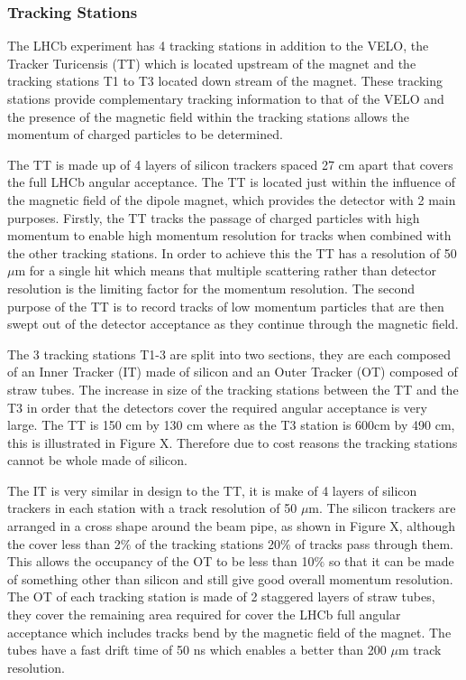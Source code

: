 \subsubsection{Tracking Stations} 
The LHCb experiment has 4 tracking stations in addition to the VELO, the Tracker Turicensis (TT) which is located upstream of the magnet and the tracking stations T1 to T3 located down stream of the magnet. These tracking stations provide complementary tracking information to that of the VELO and the presence of the magnetic field within the tracking stations allows the momentum of charged particles to be determined. 



The TT is made up of 4 layers of silicon trackers spaced 27 cm apart that covers the full LHCb angular acceptance. The TT is located just within the influence of the magnetic field of the dipole magnet, which provides the detector with 2 main purposes. Firstly, the TT tracks the passage of charged particles with high momentum to enable high momentum resolution for tracks when combined with the other tracking stations. In order to achieve this the TT has a resolution of 50 $\mu$m for a single hit which means that multiple scattering rather than detector resolution is the limiting factor for the momentum resolution. The second purpose of the TT is to record tracks of low momentum particles that are then swept out of the detector acceptance as they continue through the magnetic field. 


The 3 tracking stations T1-3 are split into two sections, they are each composed of an Inner Tracker (IT) made of silicon and an Outer Tracker (OT) composed of straw tubes. 
The increase in size of the tracking stations between the TT and the T3 in order that the detectors cover the required angular acceptance is very large.  The TT is 150 cm by 130 cm where as the T3 station is 600cm by 490 cm, this is illustrated in Figure X. Therefore due to cost reasons the tracking stations cannot be whole made of silicon. 

The IT is very similar in design to the TT, it is make of 4 layers of silicon trackers in each station with a track resolution of 50 $\mu$m.
The silicon trackers are arranged in a cross shape around the beam pipe, as shown in Figure X, although the cover less than 2$\%$ of the tracking stations 20$\%$ of tracks pass through them. This allows the occupancy of the OT to be less than 10$\%$ so that it can be made of something other than silicon and still give good overall momentum resolution. The OT of each tracking station is made of 2 staggered layers of straw tubes, they cover the remaining area required for cover the LHCb full angular acceptance which includes tracks bend by the magnetic field of the magnet. The tubes have a fast drift time of 50 ns which enables a better than 200 $\mu$m track resolution. 


